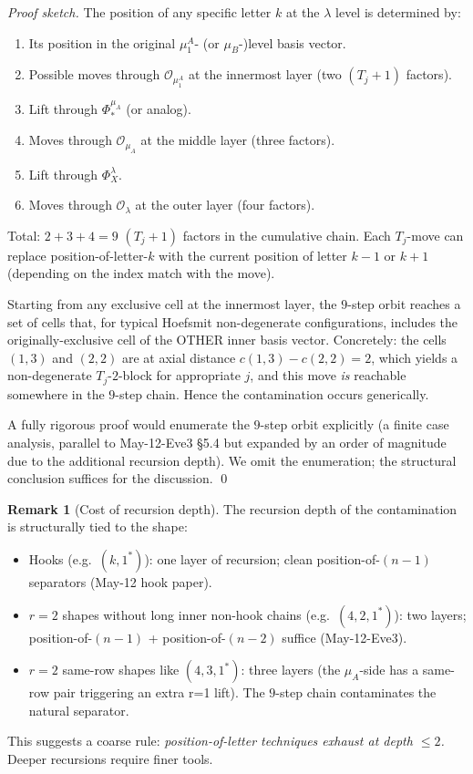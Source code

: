 \documentclass[11pt]{article}
\theoremstyle{definition}
\newtheorem{remark}[theorem]{Remark}
\begin{document}
\begin{proof}[Proof sketch]
The position of any specific letter $k$ at the $\lambda$ level is
determined by:
\begin{enumerate}[leftmargin=2em,topsep=0.2em,itemsep=0.1em]
\item Its position in the original $\mu_1^A$- (or $\mu_B$-)level basis
vector.
\item Possible moves through $\mathcal{O}_{\mu_1^A}$ at the innermost
layer (two $(T_j+1)$ factors).
\item Lift through $\Phi_*^{\mu_A}$ (or analog).
\item Moves through $\mathcal{O}_{\mu_A}$ at the middle layer (three
factors).
\item Lift through $\Phi_X^\lambda$.
\item Moves through $\mathcal{O}_\lambda$ at the outer layer (four
factors).
\end{enumerate}
Total: $2 + 3 + 4 = 9$ $(T_j+1)$ factors in the cumulative chain.
Each $T_j$-move can replace position-of-letter-$k$ with the current
position of letter $k-1$ or $k+1$ (depending on the index match
with the move).

Starting from any exclusive cell at the innermost layer, the
$9$-step orbit reaches a set of cells that, for typical Hoefsmit
non-degenerate configurations, includes the originally-exclusive
cell of the OTHER inner basis vector. Concretely: the cells
$(1, 3)$ and $(2, 2)$ are at axial distance $c(1, 3) - c(2, 2) = 2$,
which yields a non-degenerate $T_j$-$2$-block for appropriate $j$, and
this move \emph{is} reachable somewhere in the $9$-step chain. Hence
the contamination occurs generically.

A fully rigorous proof would enumerate the $9$-step orbit
explicitly (a finite case analysis, parallel to May-12-Eve3 \S5.4 but
expanded by an order of magnitude due to the additional recursion
depth). We omit the enumeration; the structural conclusion suffices
for the discussion.
\qed
\end{proof}

\begin{remark}[Cost of recursion depth]\label{rem:depth-cost}
The recursion depth of the contamination is structurally tied to the
shape:
\begin{itemize}[leftmargin=2em,topsep=0.2em,itemsep=0.1em]
\item Hooks (e.g.\ $(k, 1^*)$): one layer of recursion; clean
position-of-$(n-1)$ separators (May-12 hook paper).
\item $r = 2$ shapes without long inner non-hook chains (e.g.\
$(4, 2, 1^*)$): two layers; position-of-$(n-1)$ + position-of-$(n-2)$
suffice (May-12-Eve3).
\item $r = 2$ same-row shapes like $(4, 3, 1^*)$: three layers (the
$\mu_A$-side has a same-row pair triggering an extra r=1 lift). The
$9$-step chain contaminates the natural separator.
\end{itemize}
This suggests a coarse rule: \emph{position-of-letter techniques
exhaust at depth $\le 2$.} Deeper recursions require finer tools.
\end{remark}
\end{document}
